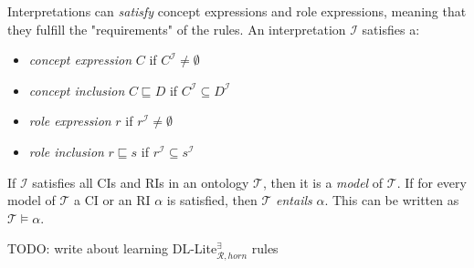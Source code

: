 Interpretations can \emph{satisfy} concept expressions and role expressions, meaning that they fulfill the "requirements" of the rules. An interpretation $\mathcal{I}$ satisfies a:
\begin{itemize}
    \item \emph{concept expression} $C$ if $C^{\mathcal{I}} \neq \emptyset$
    \item \emph{concept inclusion} $C \sqsubseteq D$ if $C^{\mathcal{I}} \subseteq D^{\mathcal{I}}$
    \item \emph{role expression} $r$ if $r^{\mathcal{I}} \neq \emptyset$
    \item \emph{role inclusion } $r \sqsubseteq s$ if $r^{\mathcal{I}}  \subseteq s^{\mathcal{I}}$
\end{itemize} 

If $\mathcal{I}$ satisfies all CIs and RIs in an ontology $\mathcal{T}$, then it is a \emph{model} of $\mathcal{T}$. If for every model of $\mathcal{T}$ a CI or an RI $\alpha$ is satisfied, then $\mathcal{T}$ \emph{entails} $\alpha$. This can be written as $\mathcal{T} \models \alpha$.



TODO: write about learning DL-Lite$_{\mathcal{R}, horn}^{\exists}$ rules


